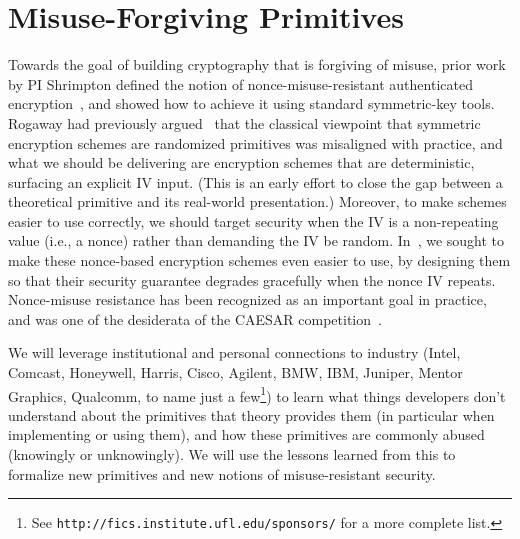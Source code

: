 \section{Misuse-Forgiving Primitives}
Towards the goal of building cryptography that is forgiving of misuse, prior
work by PI Shrimpton defined the notion of nonce-misuse-resistant authenticated
encryption~\cite{RS06}, and showed how to achieve it using standard
symmetric-key tools.  Rogaway had previously argued~\cite{xxx} that the
classical viewpoint that symmetric encryption schemes are randomized primitives
was misaligned with practice, and what we should be delivering are encryption
schemes that are deterministic, surfacing an explicit IV input. (This is an
early effort to close the gap between a theoretical primitive and its real-world
presentation.)  Moreover, to make schemes easier to use correctly, we should
target security when the IV is a non-repeating value (i.e., a nonce) rather than
demanding the IV be random.  In~\cite{RS06}, we sought to make these nonce-based
encryption schemes even easier to use, by designing them so that their security
guarantee degrades gracefully when the nonce IV repeats.  Nonce-misuse
resistance has been recognized as an important goal in practice, and was one of the
desiderata of the CAESAR competition~\cite{xxx}.
%

\begin{task}
We will leverage institutional and personal connections to industry (Intel,
Comcast, Honeywell, Harris, Cisco, Agilent, BMW, IBM, Juniper, Mentor
Graphics, Qualcomm, to name just a few\footnote{See
  \texttt{http://fics.institute.ufl.edu/sponsors/} for a more complete
  list.}) to learn what things developers don't understand about the
primitives that theory provides them (in particular when implementing
or using them), and how these primitives are commonly abused (knowingly or
unknowingly).  We will use the lessons learned from this to formalize
new primitives and new notions of misuse-resistant security.
\end{task}

